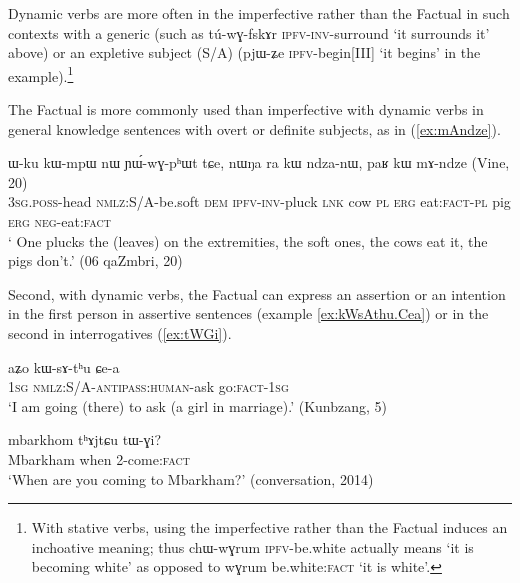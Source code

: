 \documentclass[oldfontcommands,oneside,a4paper,11pt]{article}
\newcommand{\ipa}[1]{{\phon \mbox{#1}}} %
\newcommand{\refb}[1]{(\ref{#1})}
\newcommand{\factual}[1]{\textsc{:fact}}
\begin{document}
 Dynamic verbs are more often in the imperfective rather than the Factual in such contexts with a generic (such as \ipa{tú-wɣ-fskɤr}  \textsc{ipfv-inv}-surround  `it surrounds it' above)  or an expletive subject (S/A) (\ipa{pjɯ-ʑe} \textsc{ipfv}-begin[III] `it begins' in the example).\footnote{With stative verbs, using the imperfective rather than the Factual induces an inchoative meaning; thus \ipa{chɯ-wɣrum} \textsc{ipfv}-be.white actually means `it is becoming white' as opposed to \ipa{wɣrum} be.white\factual{} `it is white'.}
 
 The Factual is more commonly used than imperfective with dynamic verbs in general knowledge sentences with overt or definite subjects, as in \refb{ex:mAndze}.  

\begin{exe}
\ex \label{ex:mAndze}
\gll
   	\ipa{ɯ-ku}  	\ipa{kɯ-mpɯ}  	\ipa{nɯ}  	\ipa{ɲɯ́-wɣ-pʰɯt}  	\ipa{tɕe,}  \ipa{nɯŋa}  	\ipa{ra}  	\ipa{kɯ}  	\ipa{ndza-nɯ,}  	\ipa{paʁ}  	\ipa{kɯ}  	\ipa{mɤ-ndze}  
(Vine, 20) \\
\textsc{3sg.poss}-head \textsc{nmlz}:S/A-be.soft \textsc{dem} \textsc{ipfv-inv}-pluck \textsc{lnk} cow \textsc{pl} \textsc{erg} eat:\textsc{fact-pl} pig \textsc{erg} \textsc{neg}-eat\factual{} \\
\glt ` One plucks the (leaves) on the extremities, the soft ones, the cows eat it, the pigs don't.' (06 qaZmbri, 20)
\end{exe}

 
Second, with dynamic verbs, the Factual can express an assertion or an intention in the first person in assertive sentences (example \ref{ex:kWsAthu.Cea}) or in the second in interrogatives (\ref{ex:tWGi}).

\begin{exe}
\ex \label{ex:kWsAthu.Cea}
\gll
\ipa{aʑo}  	\ipa{kɯ-sɤ-tʰu}  	\ipa{ɕe-a}  \\
\textsc{1sg} \textsc{nmlz}:S/A-\textsc{antipass:human}-ask go\factual{}-\textsc{1sg} \\
\glt `I am going (there) to ask (a girl in marriage).' (Kunbzang, 5)
\end{exe}

\begin{exe}
\ex \label{ex:tWGi}
\gll
\ipa{mbarkhom} \ipa{tʰɤjtɕu} \ipa{tɯ-ɣi}?\\
Mbarkham when 2-come\factual{} \\
\glt `When are you coming to Mbarkham?' (conversation, 2014)
\end{exe}
\end{document}
